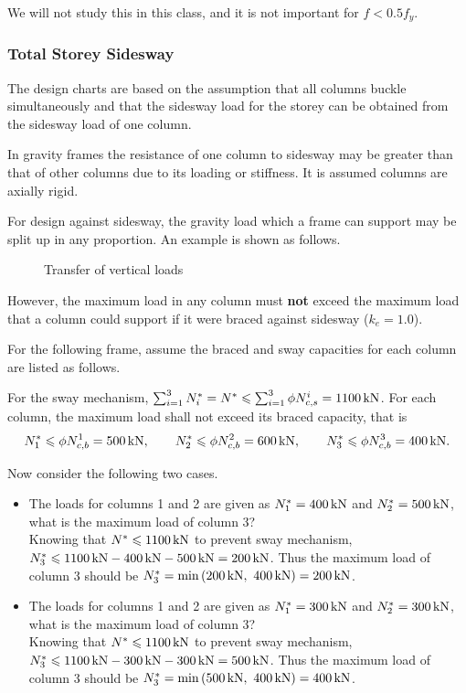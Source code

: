 We will not study this in this class, and it is not important for $f<0.5f_y$.
\subsubsection{Total Storey Sidesway}
The design charts are based on the assumption that all columns buckle simultaneously and that the sidesway load for the storey can be obtained from the sidesway load of one column.

In gravity frames the resistance of one column to sidesway may be greater than that of other columns due to its loading or stiffness. It is assumed columns are axially rigid.

For design against sidesway, the gravity load which a frame can support may be split up in any proportion. An example is shown as follows.
\begin{figure}[H]
\centering
\caption{Transfer of vertical loads}
\end{figure}

However, the maximum load in any column must \textbf{not} exceed the maximum load that a column could support if it were braced against sidesway ($k_e=1.0$).

For the following frame, assume the braced and sway capacities for each column are listed as follows.
\begin{figure}[H]
\centering
\end{figure}
For the sway mechanism, $\sum_{i=1}^3N^*_i=N^*\leqslant\sum_{i=1}^3\phi{}N_{c,s}^i=\SI{1100}{\kilo\newton}$. For each column, the maximum load shall not exceed its braced capacity, that is
\begin{gather*}
N^*_1\leqslant\phi{}N_{c,b}^1=\SI{500}{\kilo\newton},\qquad
N^*_2\leqslant\phi{}N_{c,b}^2=\SI{600}{\kilo\newton},\qquad
N^*_3\leqslant\phi{}N_{c,b}^3=\SI{400}{\kilo\newton}.
\end{gather*}

Now consider the following two cases.
\begin{itemize}
\item The loads for columns 1 and 2 are given as $N^*_1=\SI{400}{\kilo\newton}$ and $N^*_2=\SI{500}{\kilo\newton}$, what is the maximum load of column 3?\\Knowing that $N^*\leqslant\SI{1100}{\kilo\newton}$ to prevent sway mechanism, $N^*_3\leqslant\SI{1100}{\kilo\newton}-\SI{400}{\kilo\newton}-\SI{500}{\kilo\newton}=\SI{200}{\kilo\newton}$. Thus the maximum load of column 3 should be $N^*_3=\min\left(\SI{200}{\kilo\newton},~\SI{400}{\kilo\newton}\right)=\SI{200}{\kilo\newton}$.
\item The loads for columns 1 and 2 are given as $N^*_1=\SI{300}{\kilo\newton}$ and $N^*_2=\SI{300}{\kilo\newton}$, what is the maximum load of column 3?\\Knowing that $N^*\leqslant\SI{1100}{\kilo\newton}$ to prevent sway mechanism, $N^*_3\leqslant\SI{1100}{\kilo\newton}-\SI{300}{\kilo\newton}-\SI{300}{\kilo\newton}=\SI{500}{\kilo\newton}$. Thus the maximum load of column 3 should be $N^*_3=\min\left(\SI{500}{\kilo\newton},~\SI{400}{\kilo\newton}\right)=\SI{400}{\kilo\newton}$.
\end{itemize}
